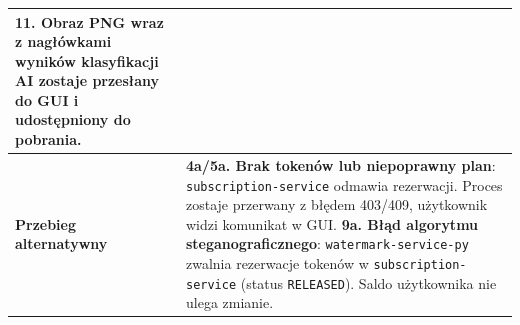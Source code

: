 \documentclass[12pt,a4paper]{article}
\begin{document}
\begin{table}[H]
\begin{tabularx}{\textwidth}{lX}
11. Obraz PNG wraz z nagłówkami wyników klasyfikacji AI zostaje przesłany do GUI i udostępniony do pobrania. \\
\midrule
\textbf{Przebieg alternatywny} & 
\textbf{4a/5a. Brak tokenów lub niepoprawny plan}: \texttt{subscription-service} odmawia rezerwacji. Proces zostaje przerwany z błędem 403/409, użytkownik widzi komunikat w GUI. \newline
\textbf{9a. Błąd algorytmu steganograficznego}: \texttt{watermark-service-py} zwalnia rezerwacje tokenów w \texttt{subscription-service} (status \texttt{RELEASED}). Saldo użytkownika nie ulega zmianie. \\
\bottomrule
\end{tabularx}
\end{table}

\newpage
\end{document}
